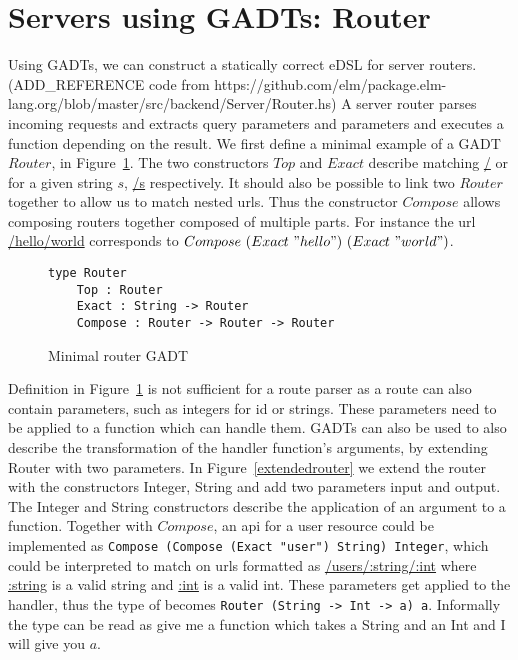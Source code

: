 \section{Servers using GADTs: Router}\label{router}

Using GADTs, we can construct a statically correct eDSL for server
routers.(ADD\_REFERENCE code from
https://github.com/elm/package.elm-lang.org/blob/master/src/backend/Server/Router.hs)
A server router parses incoming requests and extracts query parameters and
parameters and executes a function depending on the result. We first define a
minimal example of a GADT $Router$, in Figure~\ref{routergadtminimal}.  The two
constructors $Top$ and $Exact$ describe matching \url{/} or for a given string
$s$, \url{/s} respectively. It should also be possible to link two $Router$
together to allow us to match nested urls. Thus the constructor $Compose$ allows
composing routers together composed of multiple parts.  For instance the url
\url{/hello/world} corresponds to $Compose\ (Exact\ "hello")\ (Exact\ "world")$.

\begin{figure}[H]
    \begin{lstlisting}
type Router 
    Top : Router 
    Exact : String -> Router 
    Compose : Router -> Router -> Router
    \end{lstlisting}
    \caption{Minimal router GADT}
    \label{routergadtminimal}
\end{figure}


Definition in Figure~\ref{routergadtminimal} is not sufficient for a route
parser as a route can also contain parameters, such as integers for id or
strings. These parameters need to be applied to a function which can handle
them. GADTs can also be used to also describe the transformation of the handler
function's arguments, by extending Router with two parameters. In
Figure~\ref{extendedrouter} we extend the router with the constructors Integer,
String and add two parameters input and output. The Integer and String
constructors describe the application of an argument to a function. Together
with $Compose$, an api for a user resource could be implemented as
\texttt{Compose (Compose (Exact "user") String) Integer}, which could be
interpreted to match on urls formatted as \url{/users/:string/:int} where
\url{:string} is a valid string and \url{:int} is a valid int. These parameters
get applied to the handler, thus the type of becomes \texttt{Router (String ->
Int -> a) a}. Informally the type can be read as give me a function which takes
a String and an Int and I will give you $a$.

